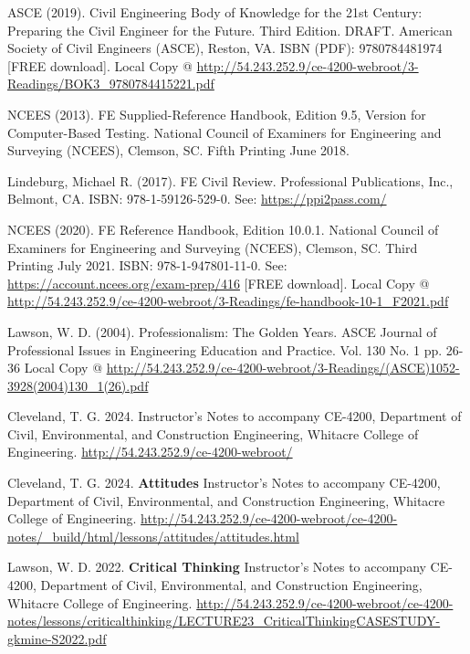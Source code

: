 \documentclass[12pt]{article}
\begin{document}
\begin{thebibliography}{}

ASCE (2019). Civil Engineering Body of Knowledge for the 21st Century: Preparing the Civil
Engineer for the Future. Third Edition. DRAFT. American Society of Civil Engineers (ASCE),
Reston, VA. ISBN (PDF): 9780784481974 [FREE download]. Local Copy @ \url{http://54.243.252.9/ce-4200-webroot/3-Readings/BOK3_9780784415221.pdf}

NCEES (2013). FE Supplied-Reference Handbook, Edition 9.5, Version for Computer-Based
Testing. National Council of Examiners for Engineering and Surveying (NCEES), Clemson,
SC. Fifth Printing June 2018.

Lindeburg, Michael R. (2017). FE Civil Review. Professional Publications, Inc., Belmont,
CA. ISBN: 978-1-59126-529-0. See: \url{https://ppi2pass.com/}

NCEES (2020). FE Reference Handbook, Edition 10.0.1. National Council of Examiners for
Engineering and Surveying (NCEES), Clemson, SC. Third Printing July 2021. ISBN: 978-1-947801-11-0.
See: \url{https://account.ncees.org/exam‐prep/416} [FREE download]. Local Copy @ \url{http://54.243.252.9/ce-4200-webroot/3-Readings/fe-handbook-10-1_F2021.pdf}

Lawson, W. D. (2004). Professionalism: The Golden Years. 
ASCE Journal of Professional Issues in Engineering Education and Practice. Vol. 130 No. 1 pp. 26-36
Local Copy @ \url{http://54.243.252.9/ce-4200-webroot/3-Readings/(ASCE)1052-3928(2004)130_1(26).pdf}

Cleveland, T. G. 2024. Instructor's Notes to accompany CE-4200, Department of Civil, Environmental, and Construction Engineering, Whitacre College of Engineering. \url{http://54.243.252.9/ce-4200-webroot/}

Cleveland, T. G. 2024. \textbf{Attitudes} Instructor's Notes to accompany CE-4200, Department of Civil, Environmental, and Construction Engineering, Whitacre College of Engineering. \url{http://54.243.252.9/ce-4200-webroot/ce-4200-notes/_build/html/lessons/attitudes/attitudes.html}

Lawson, W. D. 2022. \textbf{Critical Thinking} Instructor's Notes to accompany CE-4200, Department of Civil, Environmental, and Construction Engineering, Whitacre College of Engineering. \url{http://54.243.252.9/ce-4200-webroot/ce-4200-notes/lessons/criticalthinking/LECTURE23_CriticalThinkingCASESTUDY-gkmine-S2022.pdf}


\end{thebibliography}
\end{document}
